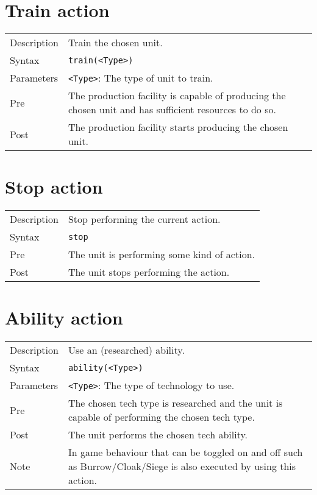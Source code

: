 \section{Train action}
\begin{tabularx}{\textwidth}{lX}
 Description & Train the chosen unit. \\
 Syntax & \verb|train(<Type>)| \\
 Parameters & \verb|<Type>|: The type of unit to train.\\
 Pre & The production facility is capable of producing the chosen unit and has sufficient resources to do so. \\
 Post & The production facility starts producing the chosen unit.
\end{tabularx}

\section{Stop action}
\begin{tabularx}{\textwidth}{lX}
 Description & Stop performing the current action. \\
 Syntax & \verb|stop| \\
 Pre & The unit is performing some kind of action. \\
 Post & The unit stops performing the action.
\end{tabularx}

\section{Ability action}
\begin{tabularx}{\textwidth}{lX}
 Description & Use an (researched) ability. \\
 Syntax & \verb|ability(<Type>)| \\
 Parameters & \verb|<Type>|: The type of technology to use.\\
 Pre & The chosen tech type is researched and the unit is capable of performing the chosen tech type. \\
 Post & The unit performs the chosen tech ability.\\
 Note & In game behaviour that can be toggled on and off such as Burrow/Cloak/Siege is also executed by using this action.
\end{tabularx}


